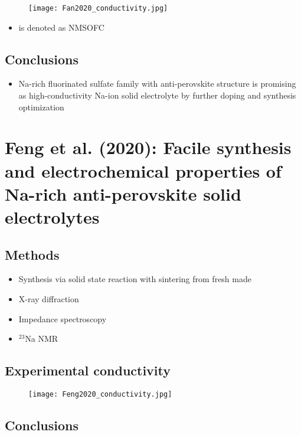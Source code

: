 \documentclass[10pt,a4paper, titlepage]{article}
\begin{document}
\begin{figure}[H]
\centering
\texttt{[image: Fan2020\_conductivity.jpg]}
\end{figure}

\begin{itemize}
  \item {} is denoted as NMSOFC
\end{itemize}

\subsection{Conclusions}

\begin{itemize}
  \item Na-rich fluorinated sulfate family with anti-perovskite structure is promising as high-conductivity Na-ion solid electrolyte by further doping and synthesis optimization
\end{itemize}

\section{Feng et al. (2020): Facile synthesis and electrochemical properties of Na-rich
anti-perovskite solid electrolytes}

\subsection{Methods}

\begin{itemize}
  \item Synthesis via solid state reaction with sintering from fresh made 
  \item X-ray diffraction
  \item Impedance spectroscopy
  \item $^{23}$Na NMR
\end{itemize}

\subsection{Experimental conductivity}

\begin{figure}[H]
\centering
\texttt{[image: Feng2020\_conductivity.jpg]}
\end{figure}

\subsection{Conclusions}
\end{document}
